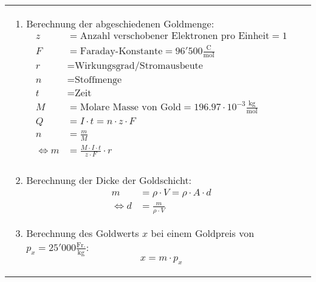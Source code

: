 \begin{longtable}{p{3cm}p{14cm}}
\begin{enumerate}
			\item Berechnung der abgeschiedenen Goldmenge:
			$$ \boxed{
				\begin{aligned}
					z &= \text{Anzahl verschobener Elektronen pro Einheit} = 1\\
					F &= \text{Faraday-Konstante} = 96'500 \frac{\mathrm{C}}{\mathrm{mol}}\\
					r &= \text{Wirkungsgrad/Stromausbeute}\\
					n &= \text{Stoffmenge}\\
					t &= \text{Zeit}\\
					M &= \text{Molare Masse von Gold} = 196.97 \cdot 10^{-3} \frac{\mathrm{kg}}{\mathrm{mol}}\\
					Q &= I \cdot t = n\cdot z \cdot F\\
					n &= \frac{m}{M}\\
					\Longleftrightarrow m &= \frac{M \cdot I \cdot t}{z\cdot F} \cdot r\\
				\end{aligned}}$$
														
			\item Berechnung der Dicke der Goldschicht:
			$$ \boxed{
				\begin{aligned}
					m 	&= \rho \cdot V = \rho \cdot A \cdot d\\
					\Longleftrightarrow d	&= \frac{m}{\rho \cdot V}
				\end{aligned}}$$
			\item Berechnung des Goldwerts $x$ bei einem Goldpreis von $p_x = 25'000 \frac{\mathrm{Fr.}}{\mathrm{kg}}$: $$\boxed{x = m \cdot  p_x}$$
		\end{enumerate}
\end{longtable}